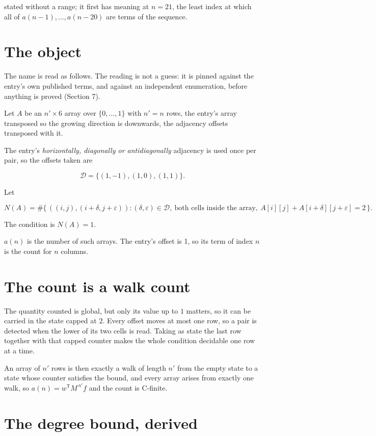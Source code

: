 \documentclass[11pt]{article}
\theoremstyle{definition}
\begin{document}
stated without a range; it first has meaning at $n = 21$, the least index at which all of $a(n-1),\dots,a(n-20)$ are terms of the sequence.

\section{The object}

The name is read as follows. The reading is not a guess: it is pinned against the entry's own published terms, and against an independent enumeration, before anything is proved (Section 7).

Let $A$ be an $n' \times 6$ array over $\{0,\dots,1\}$ with $n' = n$ rows, the entry's array transposed so the growing direction is downwards, the adjacency offsets transposed with it.

The entry's {\itshape horizontally, diagonally or antidiagonally} adjacency is used once per pair, so the offsets taken are

\[\mathcal{D} = \{(1,-1), (1,0), (1,1)\}.\]

Let

\[N(A) = \#\bigl\{\,((i,j),(i{+}\delta,j{+}\varepsilon)) : (\delta,\varepsilon) \in \mathcal{D},\ \text{both cells inside the array},\ A[i][j] + A[i{+}\delta][j{+}\varepsilon] = 2\,\bigr\}.\]

The condition is $N(A) = 1$.

$a(n)$ is the number of such arrays. The entry's offset is 1, so its term of index $n$ is the count for $n$ columns.

\section{The count is a walk count}

The quantity counted is global, but only its value up to $1$ matters, so it can be carried in the state capped at $2$. Every offset moves at most one row, so a pair is detected when the lower of its two cells is read. Taking as state the last row together with that capped counter makes the whole condition decidable one row at a time.

An array of $n'$ rows is then exactly a walk of length $n'$ from the empty state to a state whose counter satisfies the bound, and every array arises from exactly one walk, so $a(n) = w^{\mathsf T}M^{\,n'}f$ and the count is C-finite.

\section{The degree bound, derived}
\end{document}
